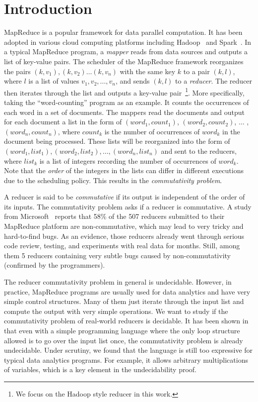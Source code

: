 
\section{Introduction}
MapReduce is a  popular framework for data parallel computation. It has been adopted in various cloud computing platforms including Hadoop~\cite{Hadoop} and Spark~\cite{Spark}. In a typical MapReduce program, a \emph{mapper} reads from data sources and outputs a list of key-value pairs. 
The scheduler of the MapReduce framework reorganizes the pairs $(k, v_1), (k,v_2)\ldots(k,v_n)$ with the same key $k$ to a pair $(k,l)$, where $l$ is a list of values $v_1,v_2,\ldots,v_n$, and sends $(k,l)$ to a \emph{reducer}. The reducer then iterates through the list and outputs a key-value pair~\footnote{We focus on the Hadoop style reducer in this work.}.
More specifically, taking the ``word-counting'' program as an example. It counts the occurrences of each word in a set of documents. The mappers read the documents and output for each document a list in the form of $(word_1, count_1)$, $(word_2, count_2)$, $\ldots$ , $(word_n, count_n)$, where $count_k$ is the number of occurrences of $word_k$ in the document being processed. These lists will be reorganized into the form of $(word_1, list_1), (word_2,list_2), \ldots, (word_n,list_n)$ and sent to the reducers, where $list_k$ is a list of integers recording the number of occurrences of $word_k$. Note that the \emph{order} of the integers in the lists can differ in different executions due to the scheduling policy. This results in the \emph{commutativity problem}.

A reducer is said to be \emph{commutative} if its output is independent of the order of its inputs. The commutativity problem asks if a reducer is commutative. A study from Microsoft~\cite{XZZ+14} reports that 58\% of the 507 reducers submitted to their MapReduce platform are non-commutative, which may lead to very tricky and hard-to-find bugs.
As an evidence, those reducers already went through serious code review, testing, and experiments with real data for months. Still, among them 5 reducers containing very subtle bugs caused by non-commutativity (confirmed by the programmers). 

The reducer commutativity problem in general is undecidable. However, in practice, MapReduce programs are usually used for data analytics and have very simple control structures. Many of them just iterate through the input list and compute the output with very simple operations. We want to study if the commutativity problem of real-world reducers is decidable. It has been shown in~\cite{CHSW15} that even with a simple programming language where the only loop structure allowed is to go over the input list once, the commutativity problem is already undecidable. Under scrutiny, we found that the language is still too expressive for typical data analytics programs. For example, it allows arbitrary multiplications of variables, which is a key element in the undecidability proof.

